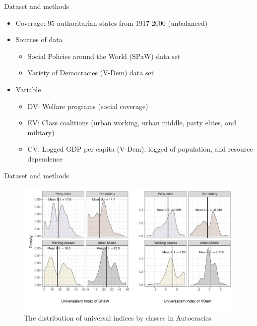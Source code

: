 \documentclass{Bredelebeamer}
\begin{document}
\begin{frame}{Dataset and methods}
\begin{itemize}
	\item Coverage: 95 authoritarian states from 1917-2000 (unbalanced)
	\item Sources of data
	\begin{itemize}
		\item Social Policies around the World (SPaW) data set
		\item Variety of Democracies (V-Dem) data set
	\end{itemize}
	\item Variable
	\begin{itemize}
		\item DV: Welfare programs \small{(social coverage)}
		\item EV: Class coalitions \small{(urban working, urban middle, party elites, and military)}
		\item CV: Logged GDP per capita (V-Dem), logged of population, and resource dependence \citep{Miller2015}
	\end{itemize}
\end{itemize}
\end{frame}

\begin{frame}{Dataset and methods}
\begin{figure}[!htbt]
	\centering
	\includegraphics[width=1\linewidth]{"../3. Datasets_Codebooks/Figures/Plot2"}
	\caption{The distribution of universal indices by classes in Autocracies}
	\label{fig:plot3}
\end{figure}
\end{frame}
\end{document}
